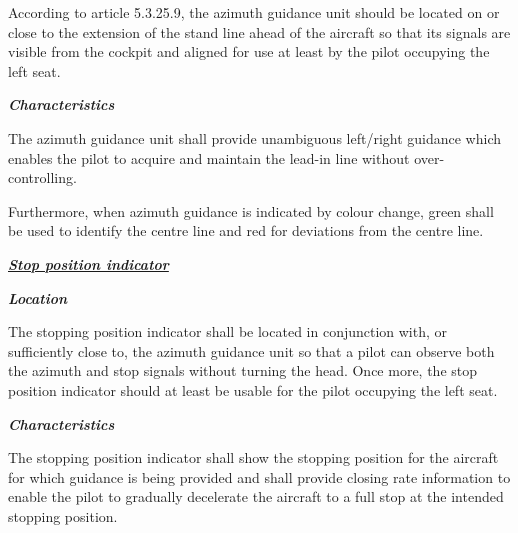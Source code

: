 		According to article 5.3.25.9, the azimuth guidance unit should be located on or close to the extension of the stand line ahead of the aircraft so that its signals are visible from the cockpit and aligned for use at least by the pilot occupying the left seat. 
		
		\textbf{\textit{Characteristics}}
		
		The azimuth guidance unit shall provide unambiguous left/right guidance which enables the pilot to acquire and maintain the lead-in line without over-controlling.
		
		Furthermore, when azimuth guidance is indicated by colour change, green shall be used to identify the centre line and red for deviations from the centre line.
		
		\underline{\textbf{\textit{Stop position indicator}}}
		
		\textbf{\textit{Location}}
		
		The stopping position indicator shall be located in conjunction with, or sufficiently close to, the azimuth guidance unit so that a pilot can observe both the azimuth and stop signals without turning the head. Once more, the stop position indicator should at least be usable for the pilot occupying the left seat.
		
		\textbf{\textit{Characteristics}}
		
		The stopping position indicator shall show the stopping position for the aircraft for which guidance is being provided and shall provide closing rate information to enable the pilot to gradually decelerate the aircraft to a full stop at the intended stopping position.
	